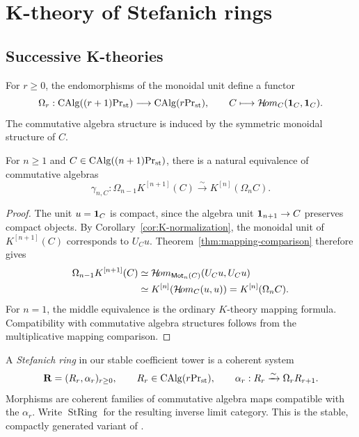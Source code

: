 



\section{K-theory of Stefanich rings}
\label{sec:stefanich}

\subsection{Successive K-theories}


For $r\geq0$, the endomorphisms of the monoidal unit
define a functor
\[
 \Omega_r:
 \operatorname{CAlg}({(r+1)}\mathrm{Pr}_{\mathrm{st}})\longrightarrow\operatorname{CAlg}({r}\mathrm{Pr}_{\mathrm{st}}),
 \qquad
 C\longmapsto\mathcal{H}\!om_C(\mathbf 1_C,\mathbf 1_C).
\]
The commutative algebra structure is induced by the
symmetric monoidal structure of $C$.

\begin{proposition}\label{prop:k-unit-end}
For $n\geq1$ and
$C\in\operatorname{CAlg}({(n+1)}\mathrm{Pr}_{\mathrm{st}})$, there is a natural
equivalence of commutative algebras
\begin{equation}\label{eq:k-unit-end}
 \gamma_{n,C}:
 \Omega_{n-1}K^{[n+1]}(C)
 \xrightarrow{\sim}
 K^{[n]}(\Omega_n C).
\end{equation}
\end{proposition}

\begin{proof}
The unit $u=\mathbf 1_C$ is compact, since the
algebra unit $\mathbf 1_{n+1}\to C$ preserves
compact objects.
By Corollary~\ref{cor:K-normalization},
the monoidal unit of $K^{[n+1]}(C)$
corresponds to $U_Cu$.
Theorem~\ref{thm:mapping-comparison} therefore
gives
\[
 \begin{aligned}
 \Omega_{n-1}K^{[n+1]}(C)
 &\simeq
 \mathcal{H}\!om_{\mathsf{Mot}_n(C)}(U_Cu,U_Cu)\\
 &\simeq K^{[n]}(\mathcal{H}\!om_C(u,u))
 =K^{[n]}(\Omega_n C).
 \end{aligned}
\]
For $n=1$, the middle equivalence is the
ordinary $K$-theory mapping formula.
Compatibility with commutative algebra
structures follows from the multiplicative
mapping comparison.
\end{proof}


A \emph{Stefanich ring} in our stable coefficient
tower is a coherent system
\[
 \mathbf R=(R_r,\alpha_r)_{r\geq0},
 \qquad
 R_r\in\operatorname{CAlg}({r}\mathrm{Pr}_{\mathrm{st}}),\qquad
 \alpha_r:R_r\xrightarrow{\sim}\Omega_rR_{r+1}.
\]
Morphisms are coherent families of commutative
algebra maps compatible with the $\alpha_r$.
Write $\operatorname{StRing}$ for the resulting
inverse limit category.
This is the stable, compactly generated variant
of \citep[Definition~3.13]{ScholzeGeometry}.



